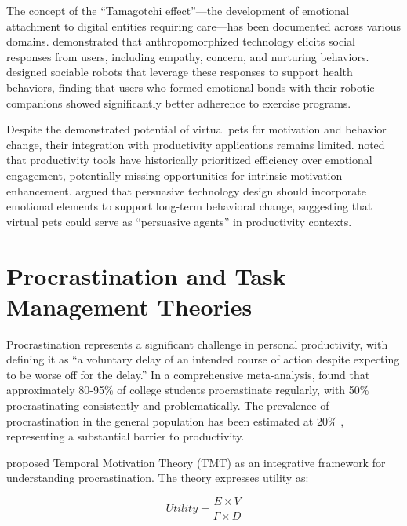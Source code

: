 The concept of the ``Tamagotchi effect''---the development of emotional attachment to digital entities requiring care---has been documented across various domains. \citet{waytz2014mind} demonstrated that anthropomorphized technology elicits social responses from users, including empathy, concern, and nurturing behaviors. \citet{kim2012sociable} designed sociable robots that leverage these responses to support health behaviors, finding that users who formed emotional bonds with their robotic companions showed significantly better adherence to exercise programs.

Despite the demonstrated potential of virtual pets for motivation and behavior change, their integration with productivity applications remains limited. \citet{csikszentmihalyi2014applications} noted that productivity tools have historically prioritized efficiency over emotional engagement, potentially missing opportunities for intrinsic motivation enhancement. \citet{fogg2009behavior} argued that persuasive technology design should incorporate emotional elements to support long-term behavioral change, suggesting that virtual pets could serve as ``persuasive agents'' in productivity contexts.

\section{Procrastination and Task Management Theories}
\label{sec:procrastination}

\inprogress

Procrastination represents a significant challenge in personal productivity, with \citet{steel2007nature} defining it as ``a voluntary delay of an intended course of action despite expecting to be worse off for the delay.'' In a comprehensive meta-analysis, \citet{steel2007nature} found that approximately 80-95\% of college students procrastinate regularly, with 50\% procrastinating consistently and problematically. The prevalence of procrastination in the general population has been estimated at 20\% \citep{harriott1996prevalence}, representing a substantial barrier to productivity.

\citet{steel2007nature} proposed Temporal Motivation Theory (TMT) as an integrative framework for understanding procrastination. The theory expresses utility as:

\begin{equation}
    Utility = \frac{E \times V}{\Gamma \times D}
\end{equation}

